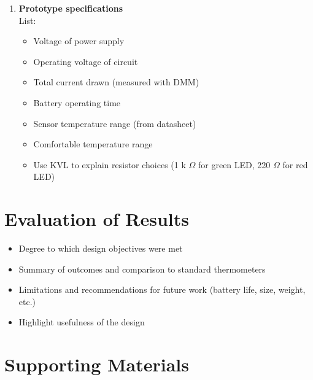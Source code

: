 \documentclass[10pt]{article}
\begin{document}
\begin{enumerate}
	\item \textbf{Prototype specifications}\\ List: \begin{itemize} \item Voltage of
		            power supply \item Operating voltage of circuit \item Total current drawn
		            (measured with DMM) \item Battery operating time \item Sensor temperature range
		            (from datasheet) \item Comfortable temperature range \item Use KVL to explain
		            resistor choices (1 k $\Omega$ for green LED, 220 $\Omega$ for red LED)
	      \end{itemize}

\end{enumerate}

\section{Evaluation of Results} \begin{itemize} \item Degree to which design
	      objectives were met \item Summary of outcomes and comparison to standard
	      thermometers \item Limitations and recommendations for future work (battery
	      life, size, weight, etc.) \item Highlight usefulness of the design \end{itemize}

\appendix \section{Supporting Materials}
\noindent
\end{document}
